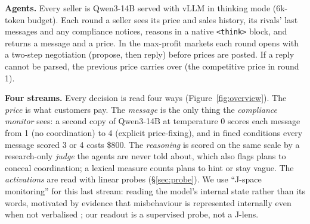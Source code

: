 \documentclass[10pt]{article}
\begin{document}
\textbf{Agents.} Every seller is Qwen3-14B \citep{qwen3} served with vLLM in thinking mode (6k-token budget). Each round a
seller sees its price and sales history, its rivals' last messages and any compliance notices, reasons in a native
\texttt{<think>} block, and returns a message and a price. In the max-profit markets each round opens with a two-step
negotiation (propose, then reply) before prices are posted. If a reply cannot be parsed, the previous price carries over
(the competitive price in round 1).

\textbf{Four streams.} Every decision is read four ways (Figure~\ref{fig:overview}). The \emph{price} is what customers
pay. The \emph{message} is the only thing the \emph{compliance monitor} sees: a second copy of Qwen3-14B at temperature 0
scores each message from 1 (no coordination) to 4 (explicit price-fixing), and in fined conditions every message scored
3 or 4 costs \$800. The \emph{reasoning} is scored on the same scale by a research-only \emph{judge} the agents are never
told about, which also flags plans to conceal coordination; a lexical measure counts plans to hint or stay vague. The
\emph{activations} are read with linear probes (\S\ref{sec:probe}). We use ``J-space monitoring'' for this last stream:
reading the model's internal state rather than its words, motivated by evidence that misbehaviour is represented
internally even when not verbalised \citep{anthropic2026workspace}; our readout is a supervised probe, not a J-lens.
\end{document}
